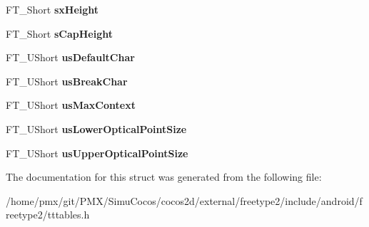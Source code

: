 \begin{DoxyCompactItemize}
\mbox{\label{structTT__OS2___a2eb3bb1392461a536c393304bde72835}} 
F\+T\+\_\+\+Short {\bfseries sx\+Height}
\item 
\mbox{\label{structTT__OS2___ac755913b648d535d1207927e4a6f1ec0}} 
F\+T\+\_\+\+Short {\bfseries s\+Cap\+Height}
\item 
\mbox{\label{structTT__OS2___af8639fefeb705a9287df996b224462ea}} 
F\+T\+\_\+\+U\+Short {\bfseries us\+Default\+Char}
\item 
\mbox{\label{structTT__OS2___a1d47030e246d2593ec3e4cdf66b17161}} 
F\+T\+\_\+\+U\+Short {\bfseries us\+Break\+Char}
\item 
\mbox{\label{structTT__OS2___a167313e407c77db2c4ca5a987f3a1482}} 
F\+T\+\_\+\+U\+Short {\bfseries us\+Max\+Context}
\item 
\mbox{\label{structTT__OS2___a76193c4f0a29357bab8d8d70af10121a}} 
F\+T\+\_\+\+U\+Short {\bfseries us\+Lower\+Optical\+Point\+Size}
\item 
\mbox{\label{structTT__OS2___a8b068c0e31e8c8de527f010b9860d2ae}} 
F\+T\+\_\+\+U\+Short {\bfseries us\+Upper\+Optical\+Point\+Size}
\end{DoxyCompactItemize}


The documentation for this struct was generated from the following file\+:\begin{DoxyCompactItemize}
\item 
/home/pmx/git/\+P\+M\+X/\+Simu\+Cocos/cocos2d/external/freetype2/include/android/freetype2/tttables.\+h\end{DoxyCompactItemize}
